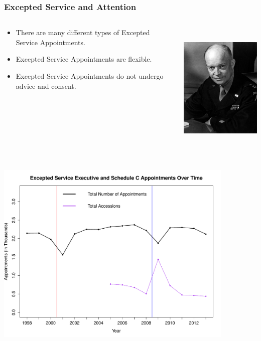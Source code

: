 \documentclass{beamer}
\begin{document}
\begin{frame}
\frametitle{Excepted Service and Attention}

\begin{columns}[T] %
\begin{column}{.48\textwidth}

\begin{itemize}\addtolength{\itemsep}{1.5\baselineskip}
\item There are many different types of Excepted Service Appointments.
\item Excepted Service Appointments are flexible.
\item Excepted Service Appointments do not undergo advice and consent.
\end{itemize}
\end{column}%
\hfill%
\begin{column}{.48\textwidth}

\includegraphics[height=2.5in,width=2in]{eisenhower.jpg}
\end{column}%
\end{columns}
\end{frame}

\begin{frame}
\begin{center}
\includegraphics[height=3.7in,width=4.5in]{RPlot.pdf}
\end{center}
\end{frame}
\end{document}
